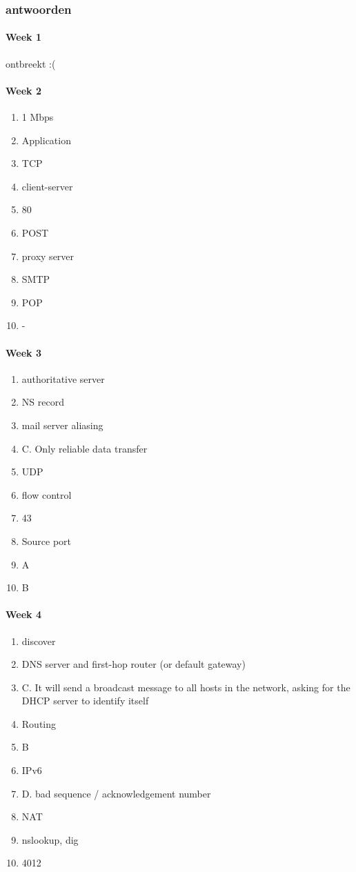 \subsubsection{antwoorden}
\paragraph{Week 1}
ontbreekt :(
\paragraph{Week 2}
\begin{enumerate}
    \item 1 Mbps
    \item Application
    \item TCP
    \item client-server
    \item 80
    \item POST
    \item proxy server
    \item SMTP
    \item POP
    \item -
\end{enumerate}
\paragraph{Week 3}
\begin{enumerate}
    \item authoritative server
    \item NS record
    \item mail server aliasing
    \item C. Only reliable data transfer
    \item UDP
    \item flow control
    \item 43
    \item Source port
    \item A
    \item B
\end{enumerate}
\paragraph{Week 4}
\begin{enumerate}
    \item discover
    \item DNS server and first-hop router (or default gateway)
    \item C. It will send a broadcast message to all hosts in the network, asking for the DHCP server to identify itself
    \item Routing
    \item B
    \item IPv6
    \item D. bad sequence / acknowledgement number
    \item NAT
    \item nslookup, dig
    \item 4012
\end{enumerate}
